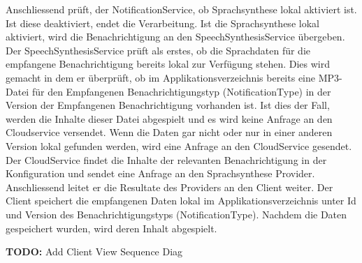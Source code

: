 Anschliessend prüft, der NotificationService, ob Sprachsynthese lokal aktiviert ist.
Ist diese deaktiviert, endet die Verarbeitung.
Ist die Sprachsynthese lokal aktiviert, wird die Benachrichtigung an den SpeechSynthesisService übergeben.
Der SpeechSynthesisService prüft als erstes, ob die Sprachdaten für die empfangene Benachrichtigung bereits lokal zur Verfügung stehen.
Dies wird gemacht in dem er überprüft, ob im Applikationsverzeichnis bereits eine MP3-Datei für den Empfangenen Benachrichtigungstyp (NotificationType) in der Version der Empfangenen Benachrichtigung vorhanden ist.
Ist dies der Fall, werden die Inhalte dieser Datei abgespielt und es wird keine Anfrage an den Cloudservice versendet.
Wenn die Daten gar nicht oder nur in einer anderen Version lokal gefunden werden, wird eine Anfrage an den CloudService gesendet.
Der CloudService findet die Inhalte der relevanten Benachrichtigung in der Konfiguration und sendet eine Anfrage an den Sprachsynthese Provider.
Anschliessend leitet er die Resultate des Providers an den Client weiter.
Der Client speichert die empfangenen Daten lokal im Applikationsverzeichnis unter Id und Version des Benachrichtigungstyps (NotificationType).
Nachdem die Daten gespeichert wurden, wird deren Inhalt abgespielt.

\textbf{TODO: } Add Client View Sequence Diag


\clearpage

